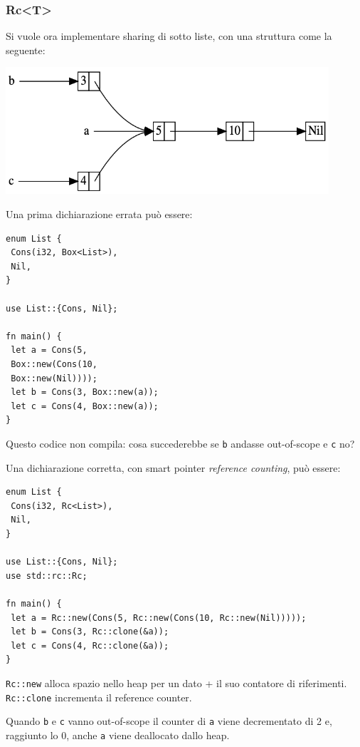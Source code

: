 \documentclass{article}
\begin{document}
\subsubsection*{Rc<T>}
Si vuole ora implementare sharing di sotto liste, con una struttura come la seguente:
\begin{center}
    \includegraphics[width=0.9\textwidth]{img/rc.png}
\end{center}
Una prima dichiarazione errata può essere:
\begin{tcolorbox}
\begin{verbatim}
enum List {
 Cons(i32, Box<List>),
 Nil,
}

use List::{Cons, Nil};

fn main() {
 let a = Cons(5,
 Box::new(Cons(10,
 Box::new(Nil))));
 let b = Cons(3, Box::new(a));
 let c = Cons(4, Box::new(a));
}
\end{verbatim}
\end{tcolorbox}
Questo codice non compila: cosa succederebbe se \texttt{b} andasse out-of-scope e \texttt{c} no?

Una dichiarazione corretta, con smart pointer \textit{reference counting}, può essere:
\begin{tcolorbox}
\begin{verbatim}
enum List {
 Cons(i32, Rc<List>),
 Nil,
}

use List::{Cons, Nil};
use std::rc::Rc;

fn main() {
 let a = Rc::new(Cons(5, Rc::new(Cons(10, Rc::new(Nil)))));
 let b = Cons(3, Rc::clone(&a));
 let c = Cons(4, Rc::clone(&a));
}
\end{verbatim}
\end{tcolorbox}
\texttt{Rc::new} alloca spazio nello heap per un dato + il suo contatore di riferimenti.\\
\texttt{Rc::clone} incrementa il reference counter.

Quando \texttt{b} e \texttt{c} vanno out-of-scope il counter di \texttt{a} viene decrementato di 2 e, raggiunto lo 0, anche \texttt{a} viene deallocato dallo heap.
\end{document}
